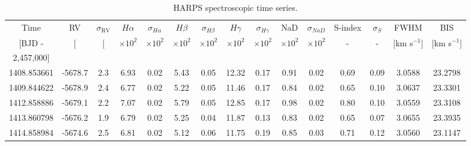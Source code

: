 \begin{table*}[t]
\caption{HARPS spectroscopic time series.}
\label{tab:timeseries}
\centering
\small
\begin{tabular}{ccccccccccccccc}
\hline\noalign{\smallskip}
Time & RV & $\sigma_{\text{RV}}$ & $H\alpha$ & $\sigma_{H\alpha}$ & $H\beta$ & $\sigma_{H\beta}$ & $H\gamma$ & $\sigma_{H\gamma}$ & NaD & $\sigma_{NaD}$ & S-index & $\sigma_{S}$ & FWHM & BIS \\ 
$[$BJD - & [\mps{]} & [\mps{]} & $\times 10^2$ & $\times 10^2$ & $\times 10^2$ & $\times 10^2$ & $\times 10^2$ & $\times 10^2$ & $\times 10^2$ & $\times 10^2$ & - & - & $[$km s$^{-1}]$ & $[$km s$^{-1}]$ \\ 
2,457,000$]$ &&&&&&&&&&&&&& \\ 
\hline\noalign{\smallskip}
1408.853661 & -5678.7 & 2.3 & 6.93 & 0.02 & 5.43 & 0.05 & 12.32 & 0.17 & 0.91 & 0.02 & 0.69 & 0.09 & 3.0588 & 23.2798 \\ 
1409.844622 & -5678.9 & 2.4 & 6.77 & 0.02 & 5.22 & 0.05 & 11.46 & 0.17 & 0.84 & 0.02 & 0.65 & 0.10 & 3.0637 & 23.3301 \\ 
1412.858886 & -5679.1 & 2.2 & 7.07 & 0.02 & 5.79 & 0.05 & 12.85 & 0.17 & 0.98 & 0.02 & 0.80 & 0.10 & 3.0559 & 23.3108 \\ 
1413.860798 & -5676.2 & 1.9 & 6.79 & 0.02 & 5.25 & 0.04 & 11.87 & 0.13 & 0.83 & 0.02 & 0.65 & 0.07 & 3.0655 & 23.3935 \\ 
1414.858984 & -5674.6 & 2.5 & 6.81 & 0.02 & 5.12 & 0.06 & 11.75 & 0.19 & 0.85 & 0.03 & 0.71 & 0.12 & 3.0560 & 23.1147 \\ 

\end{tabular}
\end{table*}
